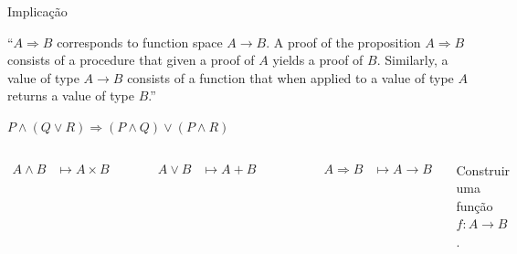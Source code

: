 \documentclass{beamer}
\begin{document}
\begin{frame}{Implicação}

“$A \Rightarrow B$ corresponds to function space $A \rightarrow B$. A proof of the proposition $A \Rightarrow B$ consists of a procedure that given a proof of $A$ yields a proof of $B$. Similarly, a value of type $A \rightarrow B$ consists of a function that when applied to a value of type $A$ returns a value of type $B$.”

\end{frame}


\begin{frame}{$P \land (Q \lor R) \Rightarrow (P \land Q) \lor (P \land R) $}

\begin{columns}
\centering

\begin{align*}
A \land B &\longmapsto A \times B
\end{align*}

\begin{prooftree}
\end{prooftree}


\begin{align*}
A \lor B &\longmapsto A + B
\end{align*}

\begin{prooftree}
\end{prooftree}

\begin{prooftree}
\end{prooftree}


\begin{align*}
A \Rightarrow B &\longmapsto A \rightarrow B
\end{align*}

Construir uma função $f : A \rightarrow B$.

\end{columns}

\end{frame}

\end{document}
